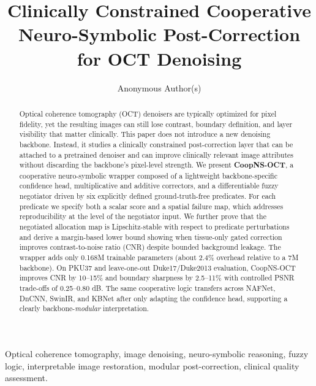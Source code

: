 \documentclass{ieeetj}
\begin{document}
\receiveddate{}
\reviseddate{}
\accepteddate{}
\publisheddate{}
\currentdate{}
\doiinfo{}
\title{Clinically Constrained Cooperative Neuro-Symbolic Post-Correction for OCT Denoising}
\author{Anonymous Author(s)}

\begin{abstract}
Optical coherence tomography (OCT) denoisers are typically optimized for pixel fidelity, yet the resulting images can still lose contrast, boundary definition, and layer visibility that matter clinically. This paper does not introduce a new denoising backbone. Instead, it studies a clinically constrained post-correction layer that can be attached to a pretrained denoiser and can improve clinically relevant image attributes without discarding the backbone's pixel-level strength. We present \textbf{CoopNS-OCT}, a cooperative neuro-symbolic wrapper composed of a lightweight backbone-specific confidence head, multiplicative and additive correctors, and a differentiable fuzzy negotiator driven by six explicitly defined ground-truth-free predicates. For each predicate we specify both a scalar score and a spatial failure map, which addresses reproducibility at the level of the negotiator input. We further prove that the negotiated allocation map is Lipschitz-stable with respect to predicate perturbations and derive a margin-based lower bound showing when tissue-only gated correction improves contrast-to-noise ratio (CNR) despite bounded background leakage. The wrapper adds only 0.168M trainable parameters (about 2.4\% overhead relative to a 7M backbone). On PKU37 and leave-one-out Duke17/Duke2013 evaluation, CoopNS-OCT improves CNR by 10--15\% and boundary sharpness by 2.5--11\% with controlled PSNR trade-offs of 0.25--0.80 dB. The same cooperative logic transfers across NAFNet, DnCNN, SwinIR, and KBNet after only adapting the confidence head, supporting a clearly backbone-\emph{modular} interpretation.
\end{abstract}

\begin{IEEEkeywords}
Optical coherence tomography, image denoising, neuro-symbolic reasoning, fuzzy logic, interpretable image restoration, modular post-correction, clinical quality assessment.
\end{IEEEkeywords}

\maketitle
\end{document}
